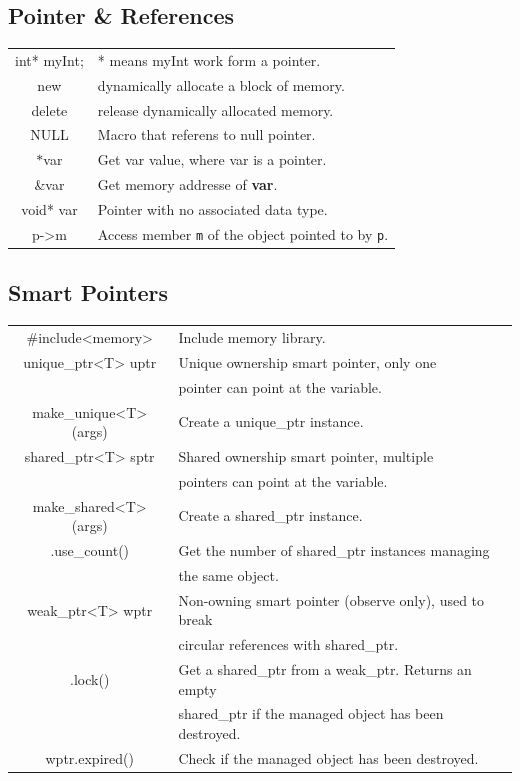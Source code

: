 \documentclass[5pt]{article}
\begin{document}
\begin{multicols}{2}
\subsection{Pointer \& References}
\begin{tabular}{C L}    
    int* myInt;             & * means myInt work form a pointer.\\
    new                     & dynamically allocate a block of memory.\\
    delete                  & release dynamically allocated memory.\\
    NULL                    & Macro that referens to null pointer.\\
    $*$var                  & Get var value, where var is a pointer.\\
    \&var                   & Get memory addresse of \textbf{var}.\\
    void* var               & Pointer with no associated data type.\\
    p->m                    & Access member \texttt{m} of the object pointed to by \texttt{p}.\\
\end{tabular}

\subsection{Smart Pointers}
\begin{tabular}{C L}   
    \#include<memory> & Include memory library.\\
    unique\_ptr<T> uptr       & Unique ownership smart pointer, only one\\
                              & pointer can point at the variable.\\
    make\_unique<T>(args)     & Create a unique\_ptr instance.\\
    shared\_ptr<T> sptr       & Shared ownership smart pointer, multiple \\
                              & pointers can point at the variable.\\
    make\_shared<T>(args)     & Create a shared\_ptr instance.\\
    .use\_count()             & Get the number of shared\_ptr instances managing \\
                              & the same object.\\

    weak\_ptr<T> wptr         & Non-owning smart pointer (observe only), used to break\\
                              & circular references with shared\_ptr.\\
    .lock()                   & Get a shared\_ptr from a weak\_ptr. Returns an empty\\
                              & shared\_ptr if the managed object has been destroyed.\\
    wptr.expired()            & Check if the managed object has been destroyed.\\
\end{tabular}


\end{multicols}
\end{document}
